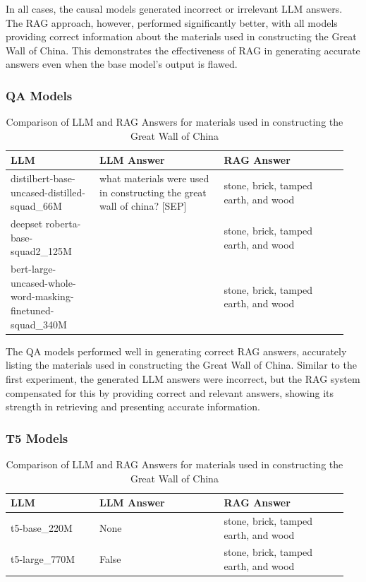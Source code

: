 \documentclass{wseas}
\begin{document}
In all cases, the causal models generated incorrect or irrelevant LLM
answers. The RAG approach, however, performed significantly better, with
all models providing correct information about the materials used in
constructing the Great Wall of China. This demonstrates the
effectiveness of RAG in generating accurate answers even when the base
model's output is flawed.

\subsubsection{QA Models}


\begin{table}[htbp]
\centering
\begin{tabular}{|p{0.25\linewidth}|p{0.35\linewidth}|p{0.35\linewidth}|}
\hline
\textbf{LLM} & \textbf{LLM Answer} & \textbf{RAG Answer} \\ \hline
distilbert-base-uncased-distilled-squad\_66M & what materials were used in constructing the great wall of china? {[}SEP{]} & stone, brick, tamped earth, and wood \\ \hline
deepset roberta-base-squad2\_125M & & stone, brick, tamped earth, and wood \\ \hline
bert-large-uncased-whole-word-masking-finetuned-squad\_340M & & stone, brick, tamped earth, and wood \\ \hline
\end{tabular}
\caption{Comparison of LLM and RAG Answers for materials used in constructing the Great Wall of China}
\end{table}


The QA models performed well in generating correct RAG answers,
accurately listing the materials used in constructing the Great Wall of
China. Similar to the first experiment, the generated LLM answers were
incorrect, but the RAG system compensated for this by providing correct
and relevant answers, showing its strength in retrieving and presenting
accurate information.

\subsubsection{T5 Models}

\begin{table}[htbp]
\centering
\begin{tabular}{|p{0.25\linewidth}|p{0.35\linewidth}|p{0.35\linewidth}|}
\hline
\textbf{LLM} & \textbf{LLM Answer} & \textbf{RAG Answer} \\ \hline
t5-base\_220M & None & stone, brick, tamped earth, and wood \\ \hline
t5-large\_770M & False & stone, brick, tamped earth, and wood \\ \hline
\end{tabular}
\caption{Comparison of LLM and RAG Answers for materials used in constructing the Great Wall of China}
\end{table}
\end{document}
